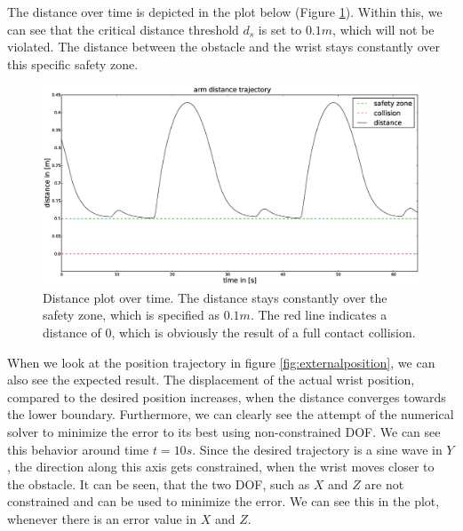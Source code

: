The distance over time is depicted in the plot below (Figure \ref{fig:externaldist}). Within this, we can see that the critical distance threshold $d_s$ is set to $0.1m$, which will not be violated. The distance between the obstacle and the wrist stays constantly over this specific safety zone.
\begin{figure}[h!]
  \centering
    \includegraphics[width=\textwidth]{../figures/arm_moves/distance.eps}
    \caption{Distance plot over time. The distance stays constantly over the safety zone, which is specified as $0.1m$. The red line indicates a distance of 0, which is obviously the result of a full contact collision.}
    \label{fig:externaldist}
\end{figure}
When we look at the position trajectory in figure \ref{fig:externalposition}, we can also see the expected result. The displacement of the actual wrist position, compared to the desired position increases, when the distance converges towards the lower boundary. Furthermore, we can clearly see the attempt of the numerical solver to minimize the error to its best using non-constrained DOF. We can see this behavior around time $t=10s$. Since the desired trajectory is a sine wave in $Y$, the direction along this axis gets constrained, when the wrist moves closer to the obstacle. It can be seen, that the two DOF, such as $X$ and $Z$ are not constrained and can be used to minimize the error. We can see this in the plot, whenever there is an error value in $X$ and $Z$. 
